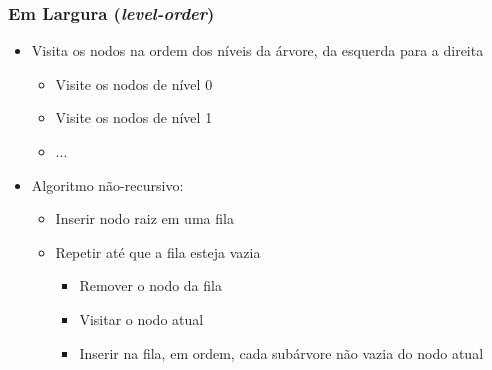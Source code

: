 \documentclass[aspectratio=169]{beamer}
\begin{document}
\begin{frame}\frametitle{Em Largura (\emph{level-order})}
\begin{itemize}
	\item Visita os nodos na ordem dos níveis da árvore, da esquerda para a direita
	\begin{itemize}
		\item Visite os nodos de nível 0
		\item Visite os nodos de nível 1
		\item ...
	\end{itemize}
	\item Algoritmo não-recursivo:
	\begin{itemize}
		\item Inserir nodo raiz em uma fila
		\item Repetir até que a fila esteja vazia
		\begin{itemize}
			\item Remover o nodo da fila	
			\item Visitar o nodo atual
			\item Inserir na fila, em ordem, cada subárvore não vazia do nodo atual
		\end{itemize}
	\end{itemize}
\end{itemize}
\end{frame}
\end{document}
